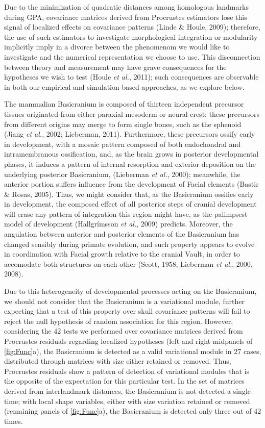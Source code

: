 \documentclass[12pt,]{article}
\begin{document}
Due to the minimization of quadratic distances among homologous
landmarks during GPA, covariance matrices derived from Procrustes
estimators lose this signal of localized effects on covariance patterns
(Linde \& Houle, 2009); therefore, the use of such estimators to
investigate morphological integration or modularity implicitly imply in
a divorce between the phenomenom we would like to investigate and the
numerical representation we choose to use. This disconnection between
theory and measurement may have grave consequences for the hypotheses we
wish to test (Houle \emph{et al.}, 2011); such consequences are
observable in both our empirical and simulation-based approaches, as we
explore below.

The mammalian Basicranium is composed of thirteen independent precursor
tissues originated from either paraxial mesoderm or neural crest; these
precursors from different origins may merge to form single bones, such
as the sphenoid (Jiang \emph{et al.}, 2002; Lieberman, 2011).
Furthermore, these precursors ossify early in development, with a mosaic
pattern composed of both endochondral and intramembranous ossification,
and, as the brain grows in posterior developmental phases, it induces a
pattern of internal resorption and exterior deposition on the underlying
posterior Basicranium, (Lieberman \emph{et al.}, 2000); meanwhile, the
anterior portion suffers influence from the development of Facial
elements (Bastir \& Rosas, 2005). Thus, we might consider that, as the
Basicranium ossifies early in development, the composed effect of all
posterior steps of cranial development will erase any pattern of
integration this region might have, as the palimpsest model of
development (Hallgrímsson \emph{et al.}, 2009) predicts. Moreover, the
angulation between anterior and posterior elements of the Basicranium
has changed sensibly during primate evolution, and such property appears
to evolve in coordination with Facial growth relative to the cranial
Vault, in order to accomodate both structures on each other (Scott,
1958; Lieberman \emph{et al.}, 2000, 2008).

Due to this heterogeneity of developmental processes acting on the
Basicranium, we should not consider that the Basicranium is a
variational module, further expecting that a test of this property over
skull covariance patterns will fail to reject the null hypothesis of
random association for this region. However, considering the 42 tests we
performed over covariance matrices derived from Procrustes residuals
regarding localized hypotheses (left and right midpanels of
\autoref{fig:Func}a), the Basicranium is detected as a valid variational
module in 27 cases, distributed through matrices with size either
retained or removed. Thus, Procrustes residuals show a pattern of
detection of variational modules that is the opposite of the expectation
for this particular test. In the set of matrices derived from
interlandmark distances, the Basicranium is not detected a single time;
with local shape variables, either with size variation retained or
removed (remaining panels of \autoref{fig:Func}a), the Basicranium is
detected only three out of 42 times.
\end{document}
